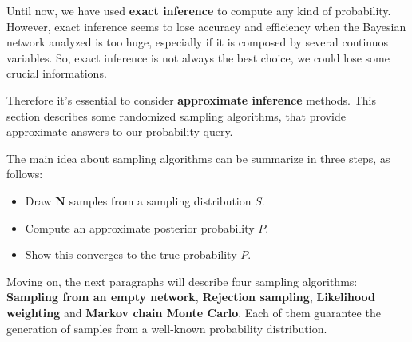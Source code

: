 Until now, we have used \textbf{exact inference} to compute any kind of probability. However, exact inference seems to lose accuracy and efficiency when the Bayesian network
analyzed is too huge, especially if it is composed by several continuos variables. So, exact inference is not always the best choice, we could lose some crucial informations. \vspace{3.5pt}

Therefore it's essential to consider \textbf{approximate inference} methods. This section describes some randomized sampling algorithms, that provide approximate answers to
our probability query. \vspace{3.5pt}

The main idea about sampling algorithms can be summarize in three steps, as follows:
\begin{itemize}
    \renewcommand{\labelitemi}{-}
    \item Draw $\mathbf{N}$ samples from a sampling distribution $S$.
    \item Compute an approximate posterior probability $P$.
    \item Show this converges to the true probability $P$.
\end{itemize}
Moving on, the next paragraphs will describe four sampling algorithms: \textbf{Sampling from an empty network}, \textbf{Rejection sampling}, \textbf{Likelihood weighting} and 
\textbf{Markov chain Monte Carlo}. Each of them guarantee the generation of samples from a well-known probability distribution.
